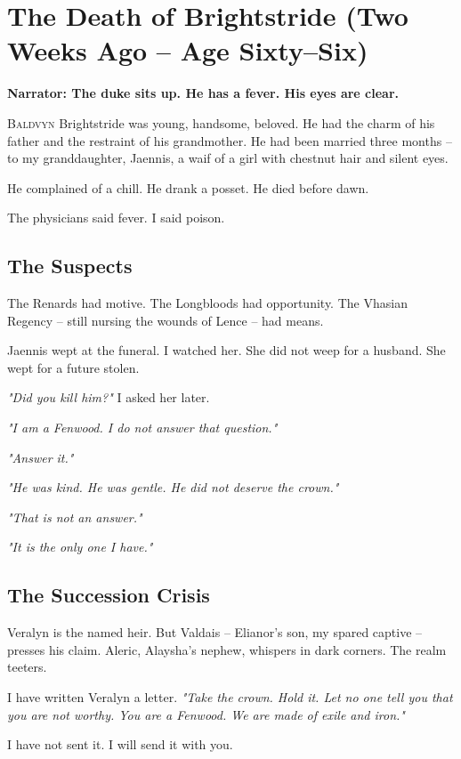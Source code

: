 \documentclass[11pt]{book}
\begin{document}
\clearpage

\chapter{The Death of Brightstride (Two Weeks Ago -- Age Sixty--Six)}

\textbf{Narrator: The duke sits up. He has a fever. His eyes are clear.}

\lettrine{B}{aldvyn} Brightstride was young, handsome, beloved. He had the charm of his father and the restraint of his grandmother. He had been married three months -- to my granddaughter, Jaennis, a waif of a girl with chestnut hair and silent eyes.

He complained of a chill. He drank a posset. He died before dawn.

The physicians said fever. I said poison.

\section*{The Suspects}
The Renards had motive. The Longbloods had opportunity. The Vhasian Regency -- still nursing the wounds of Lence -- had means.

Jaennis wept at the funeral. I watched her. She did not weep for a husband. She wept for a future stolen.

\emph{"Did you kill him?"} I asked her later.

\emph{"I am a Fenwood. I do not answer that question."}

\emph{"Answer it."}

\emph{"He was kind. He was gentle. He did not deserve the crown."}

\emph{"That is not an answer."}

\emph{"It is the only one I have."}

\section*{The Succession Crisis}
Veralyn is the named heir. But Valdais -- Elianor's son, my spared captive -- presses his claim. Aleric, Alaysha's nephew, whispers in dark corners. The realm teeters.

I have written Veralyn a letter. \emph{"Take the crown. Hold it. Let no one tell you that you are not worthy. You are a Fenwood. We are made of exile and iron."}

I have not sent it. I will send it with you.
\end{document}
